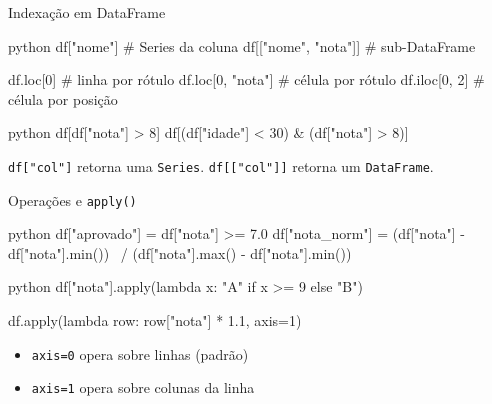 \documentclass[xcolor=dvipsnames,t,aspectratio=169]{beamer}
\begin{document}
\begin{frame}[c, fragile]{Indexação em DataFrame}

\begin{code}{python}
df["nome"]              # Series da coluna
df[["nome", "nota"]]    # sub-DataFrame

df.loc[0]               # linha por rótulo
df.loc[0, "nota"]       # célula por rótulo
df.iloc[0, 2]           # célula por posição
\end{code}

\begin{code}{python}
df[df["nota"] > 8]
df[(df["idade"] < 30) & (df["nota"] > 8)]
\end{code}

\begin{display}[Atenção]
\texttt{df["col"]} retorna uma \texttt{Series}. \texttt{df[["col"]]} retorna um \texttt{DataFrame}.
\end{display}

\end{frame}


\begin{frame}[c, fragile]{Operações e \texttt{apply()}}

\begin{code}{python}
df["aprovado"] = df["nota"] >= 7.0
df["nota_norm"] = (df["nota"] - df["nota"].min()) \
                / (df["nota"].max() - df["nota"].min())
\end{code}

\begin{code}{python}
df["nota"].apply(lambda x: "A" if x >= 9 else "B")

df.apply(lambda row: row["nota"] * 1.1, axis=1)
\end{code}

\begin{itemize}
    \item \texttt{axis=0} opera sobre linhas (padrão)
    \item \texttt{axis=1} opera sobre colunas da linha
\end{itemize}

\end{frame}
\end{document}

